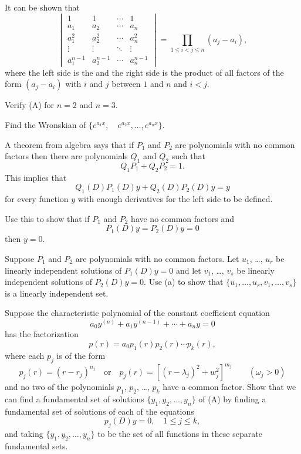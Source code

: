 \begin{exerciselist}
\item\label{exer:9.2.39}It can be shown that
\[
\begin{vmatrix}
1&1&\cdots&1\\
a_1&a_2&\cdots&a_n\\
a^2_1&a^2_2&\cdots&a^2_n\\
\vdots&\vdots&\ddots&\vdots\\
a^{n-1}_1&a^{n-1}_2&\cdots&a^{n-1}_n
\end{vmatrix}=
\prod_{1\le i<j\le n}(a_j-a_i),
\tag{A}
\]
where the left side is  the
 and
the right side is the product of all factors of the form $(a_j-a_i)$
with $i$ and $j$ between $1$ and $n$ and $i<j$.

\begin{alist}
\item %
Verify  (A) for $n=2$ and $n=3$.

\item %
Find the Wronskian of $\{e^{{a_1}x}, \quad  e^{{a_2}x},\dots, e^{{a_n}x}\}$.
\end{alist}

\item\label{exer:9.2.40}A theorem from algebra says that if $P_1$ and $P_2$ are polynomials
with no common factors then there are polynomials $Q_1$ and $Q_2$
such that
\[
Q_1P_1+Q_2P_2=1.
\]
This implies that
\[
Q_1(D)P_1(D)y+Q_2(D)P_2(D)y=y
\]
for every function $y$ with enough derivatives for the left side to be
defined.

\begin{alist}
\item %
Use this to show that if $P_1$ and $P_2$ have no common factors and
\[
P_1(D)y=P_2(D)y=0
\]
then $y=0$.

\item %
Suppose $P_1$ and $P_2$ are polynomials with no common factors.
Let $u_1$, \dots, $u_r$ be linearly independent solutions of $P_1(D)y=0$
and let $v_1$, \dots, $v_s$ be linearly independent solutions of
$P_2(D)y=0$. Use (a) to show that $\{u_1,\dots,u_r,\allowbreak
v_1,\dots,v_s\}$ is a linearly independent set.

\item %
Suppose the characteristic polynomial of the constant coefficient
equation
\[
a_0y^{(n)}+a_1y^{(n-1)}+\cdots+a_ny=0
\tag{A}
\]
has the factorization
\[
p(r)=a_0p_1(r)p_2(r)\cdots p_k(r),
\]
where each $p_j$ is of the form
\[
p_j(r)=(r-r_j)^{n_j} \quad\text{or}\quad
p_j(r)=[(r-\lambda_j)^2+w^2_j]^{m_j}\qquad  (\omega_j>0)
\]
and no two of the polynomials $p_1$, $p_2$, \dots, $p_k$ have a common
factor. Show that we can find a fundamental set of solutions
$\{y_1,y_2,\dots,y_n\}$ of (A) by finding a
fundamental set of solutions of each of the equations
\[
p_j(D)y=0,\quad 1\le j\le k,
\]
 and taking $\{y_1,y_2,\dots,y_n\}$ to be the set of all
functions in these separate fundamental sets.
\end{alist}


\end{exerciselist}
